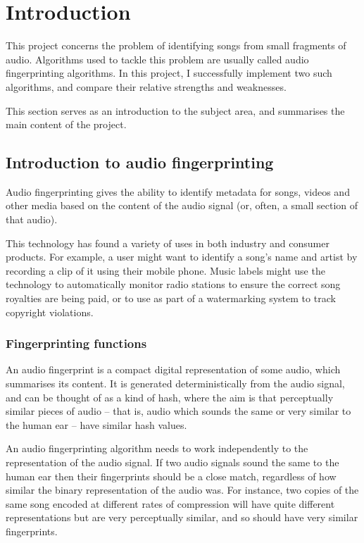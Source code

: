\documentclass[12pt,a4paper,twoside,openright]{report}
\begin{document}
\pagestyle{headings}



\chapter{Introduction}
\label{introduction}

This project concerns the problem of identifying songs from small fragments of audio. Algorithms used to tackle this problem are usually called audio fingerprinting algorithms. In this project, I successfully implement two such algorithms, and compare their relative strengths and weaknesses.

This section serves as an introduction to the subject area, and summarises the main content of the project.

\section{Introduction to audio fingerprinting}

Audio fingerprinting gives the ability to identify metadata for songs, videos and other media based on the content of the audio signal (or, often, a small section of that audio).

This technology has found a variety of uses in both industry and consumer products. For example, a user might want to identify a song's name and artist by recording a clip of it using their mobile phone. Music labels might use the technology to automatically monitor radio stations to ensure the correct song royalties are being paid, or to use as part of a watermarking system to track copyright violations.


\subsection{Fingerprinting functions}

An audio fingerprint is a compact digital representation of some audio, which summarises its content. It is generated deterministically from the audio signal, and can be thought of as a kind of hash, where the aim is that perceptually similar pieces of audio -- that is, audio which sounds the same or very similar to the human ear -- have similar hash values.

An audio fingerprinting algorithm needs to work independently to the representation of the audio signal. If two audio signals sound the same to the human ear then their fingerprints should be a close match, regardless of how similar the binary representation of the audio was. For instance, two copies of the same song encoded at different rates of compression will have quite different representations but are very perceptually similar, and so should have very similar fingerprints.
\end{document}
